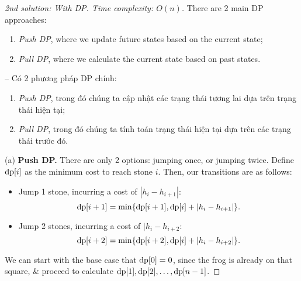 \documentclass{article}
\begin{document}
\begin{proof}[2nd solution: With DP. Time complexity: $O(n)$]
    There are 2 main DP approaches:
    \begin{enumerate}
        \item {\it Push DP}, where we update future states based on the current state;
        \item {\it Pull DP}, where we calculate the current state based on past states.
    \end{enumerate}
    -- Có 2 phương pháp DP chính:
    \begin{enumerate}
        \item {\it Push DP}, trong đó chúng ta cập nhật các trạng thái tương lai dựa trên trạng thái hiện tại;
        \item {\it Pull DP}, trong đó chúng ta tính toán trạng thái hiện tại dựa trên các trạng thái trước đó.
    \end{enumerate}
    \item(a) {\bf Push DP.} There are only 2 options: jumping once, or jumping twice. Define ${\rm dp}[i]$ as the minimum cost to reach stone $i$. Then, our transitions are as follows:
    \begin{itemize}
        \item Jump 1 stone, incurring a cost of $|h_i - h_{i+1}|$:
        \begin{equation*}
            {\rm dp}[i + 1] = \min\{{\rm dp}[i + 1],{\rm dp}[i] + |h_i - h_{i+1}|\}.
        \end{equation*}
        \item Jump 2 stones, incurring a cost of $|h_i - h_{i+2}$:
        \begin{equation*}
            {\rm dp}[i + 2] = \min\{{\rm dp}[i + 2],{\rm dp}[i] + |h_i - h_{i+2}|\}.
        \end{equation*}
    \end{itemize}
    We can start with the base case that ${\rm dp}[0] = 0$, since the frog is already on that square, \& proceed to calculate ${\rm dp}[1],{\rm dp}[2],\ldots,{\rm dp}[n - 1]$.


\end{proof}
\end{document}
